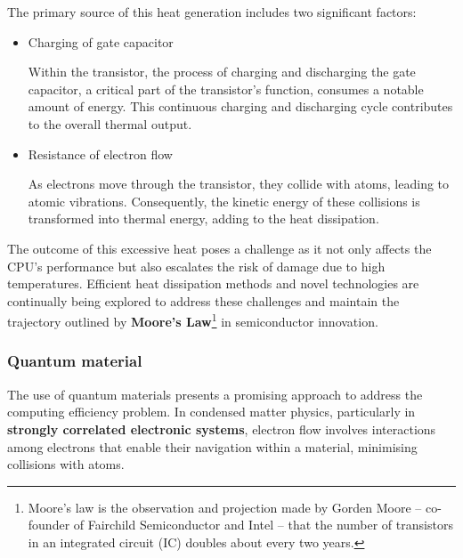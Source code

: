 \documentclass[12pt,a4paper]{article}
\begin{document}
The primary source of this heat generation includes two significant factors:

\begin{itemize}
\item Charging of gate capacitor

Within the transistor, the process of charging and discharging the gate capacitor, a critical part of the transistor's function, consumes a notable amount of energy. This continuous charging and discharging cycle contributes to the overall thermal output.

\item Resistance of electron flow

As electrons move through the transistor, they collide with atoms, leading to atomic vibrations. Consequently, the kinetic energy of these collisions is transformed into thermal energy, adding to the heat dissipation.
\end{itemize}

The outcome of this excessive heat poses a challenge as it not only affects the CPU's performance but also escalates the risk of damage due to high temperatures. Efficient heat dissipation methods and novel technologies are continually being explored to address these challenges and maintain the trajectory outlined by \textbf{Moore's Law}\footnote{Moore's law is the observation and projection made by Gorden Moore -- co-founder of Fairchild Semiconductor and Intel -- that the number of transistors in an integrated circuit (IC) doubles about every two years.} in semiconductor innovation.

\subsubsection{Quantum material}
The use of quantum materials presents a promising approach to address the computing efficiency problem. In condensed matter physics, particularly in \textbf{strongly correlated electronic systems}, electron flow involves interactions among electrons that enable their navigation within a material, minimising collisions with atoms.
\end{document}
